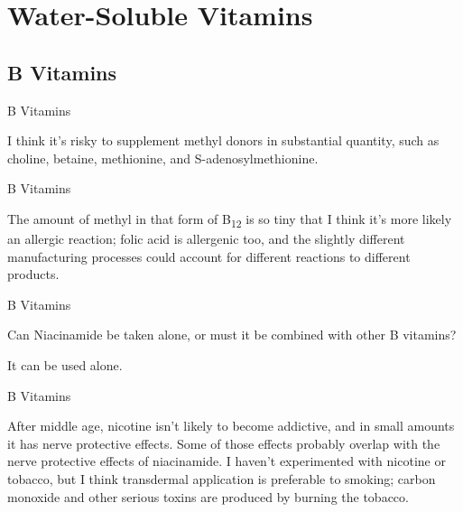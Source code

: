 \documentclass[11pt,oneside,openany,extrafontsizes]{memoir}
\begin{document}
\section{Water-Soluble Vitamins}
\subsection{B Vitamins}

\begin{standalonequote}{B Vitamins}

    \begin{answer}
        I think it's risky to supplement methyl donors in substantial quantity, such as choline, betaine, methionine, and S-adenosylmethionine.
    \end{answer}
\end{standalonequote}

\begin{standalonequote}{B Vitamins}

    \begin{answer}
        The amount of methyl in that form of B\textsubscript{12} is so tiny that I think it's more likely an allergic reaction; folic acid is allergenic too, and the slightly different manufacturing processes could account for different reactions to different products.
    \end{answer}
\end{standalonequote}

\begin{qaexchange}{B Vitamins}

    \begin{question}
        Can Niacinamide be taken alone, or must it be combined with other B vitamins?
    \end{question}

    \begin{answer}
        It can be used alone.
    \end{answer}
\end{qaexchange}

\begin{standalonequote}{B Vitamins}

    \begin{answer}
        After middle age, nicotine isn't likely to become addictive, and in small amounts it has nerve protective effects. Some of those effects probably overlap with the nerve protective effects of niacinamide. I haven't experimented with nicotine or tobacco, but I think transdermal application is preferable to smoking; carbon monoxide and other serious toxins are produced by burning the tobacco.
    \end{answer}
\end{standalonequote}
\end{document}
